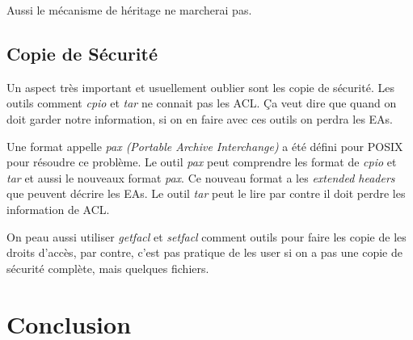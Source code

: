 Aussi le mécanisme de héritage ne marcherai pas. 

\subsection*{Copie de Sécurité}

Un aspect très important et usuellement oublier sont les copie de sécurité. Les outils comment \emph{cpio} et \emph{tar} ne connait pas les ACL. Ça veut dire que quand on doit garder notre information, si on en faire avec ces outils on perdra les EAs.

Une format appelle \emph{pax (Portable Archive Interchange)} a été défini pour POSIX pour résoudre ce problème. Le outil \emph{pax} peut comprendre les format de \emph{cpio} et \emph{tar} et aussi le nouveaux format \emph{pax}. Ce nouveau format a les \emph{extended headers} que peuvent décrire les EAs. Le outil \emph{tar} peut le lire par contre il doit perdre les information de ACL. 

On peau aussi utiliser \emph{getfacl} et \emph{setfacl} comment outils pour faire les copie de les droits d'accès, par contre, c'est pas pratique de les user si on a pas une copie de sécurité complète, mais quelques fichiers. \section*{Conclusion}

\newpage

